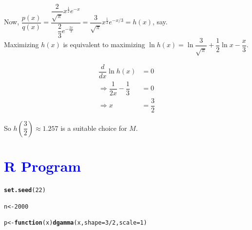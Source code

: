 \documentclass[11pt, a4paper]{article}\usepackage[]{graphicx}\usepackage[]{xcolor}
\makeatletter
\newcommand{\hlnum}[1]{\textcolor[rgb]{0.686,0.059,0.569}{#1}}%
\newcommand{\hlopt}[1]{\textcolor[rgb]{0,0,0}{#1}}%
\newcommand{\hldef}[1]{\textcolor[rgb]{0.345,0.345,0.345}{#1}}%
\newcommand{\hlkwa}[1]{\textcolor[rgb]{0.161,0.373,0.58}{\textbf{#1}}}%
\newcommand{\hlkwb}[1]{\textcolor[rgb]{0.69,0.353,0.396}{#1}}%
\newcommand{\hlkwc}[1]{\textcolor[rgb]{0.333,0.667,0.333}{#1}}%
\newcommand{\hlkwd}[1]{\textcolor[rgb]{0.737,0.353,0.396}{\textbf{#1}}}%
\newenvironment{kframe}{%
 \def\at@end@of@kframe{}%
 \ifinner\ifhmode%
  \def\at@end@of@kframe{\end{minipage}}%
  \begin{minipage}{\columnwidth}%
 \fi\fi%
 \def\FrameCommand##1{\hskip\@totalleftmargin \hskip-\fboxsep
 \colorbox{shadecolor}{##1}\hskip-\fboxsep
     \hskip-\linewidth \hskip-\@totalleftmargin \hskip\columnwidth}%
 \MakeFramed {\advance\hsize-\width
   \@totalleftmargin\z@ \linewidth\hsize
   \@setminipage}}%
 {\par\unskip\endMakeFramed%
 \at@end@of@kframe}
\newenvironment{knitrout}{}{} %
\makeatother
\begin{document}
Now, $\dfrac{p(x)}{q(x)} = \dfrac{\dfrac{2}{\sqrt{\pi}} x^{\frac{1}{2}}e^{-x}}{\dfrac{2}{3} e^{-\frac{2x}{3}}} = \dfrac{3}{\sqrt{\pi}} x^{\frac{1}{2}} e^{-x/3} = h(x)$, say. \\[0.2em]

Maximizing $h(x)$ is equivalent to maximizing $\ln h(x) = \ln \dfrac{3}{\sqrt{\pi}} + \dfrac{1}{2} \ln x - \dfrac{x}{3}$.

\begin{align*}
\dfrac{d}{dx} \ln h(x) &= 0 \\[0.3em]
\Rightarrow \dfrac{1}{2x} - \dfrac{1}{3} &= 0 \\[0.3em]
\Rightarrow x &= \dfrac{3}{2}
\end{align*}

So $h\left(\dfrac{3}{2}\right) \approx 1.257$ is a suitable choice for $M$.

\newpage

\section*{\faArrowAltCircleRight[regular] \textcolor{blue}{R Program}}

\begin{knitrout}
\color{fgcolor}\begin{kframe}
\begin{alltt}
\hlkwd{set.seed}\hldef{(}\hlnum{22}\hldef{)}
\end{alltt}
\end{kframe}
\end{knitrout}

\begin{knitrout}
\color{fgcolor}\begin{kframe}
\begin{alltt}
\hldef{n} \hlkwb{<-} \hlnum{2000}
\end{alltt}
\end{kframe}
\end{knitrout}

\begin{knitrout}
\color{fgcolor}\begin{kframe}
\begin{alltt}
\hldef{p} \hlkwb{<-} \hlkwa{function}\hldef{(}\hlkwc{x}\hldef{)} \hlkwd{dgamma}\hldef{(x,} \hlkwc{shape} \hldef{=} \hlnum{3}\hlopt{/}\hlnum{2}\hldef{,} \hlkwc{scale} \hldef{=} \hlnum{1}\hldef{)}
\end{alltt}
\end{kframe}
\end{knitrout}
\end{document}
